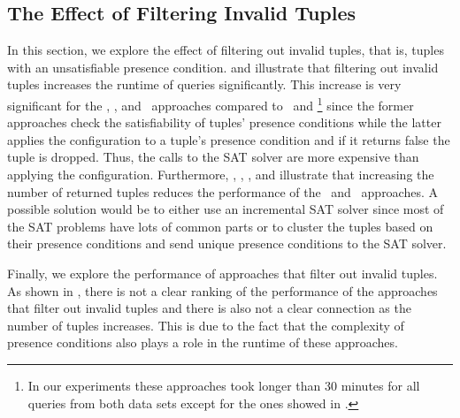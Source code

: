 \subsection{The Effect of Filtering Invalid Tuples}
\label{sec:exp-tuples}

In this section, we explore the effect of filtering out invalid tuples, that is, tuples with
an unsatisfiable presence condition.  and 
illustrate that filtering out invalid tuples increases the runtime of queries significantly. 
%
This increase is very significant for the \ubf, \ubfi, and \uav\ approaches compared to
\nbf\ and \nbfi\footnote{In our experiments these approaches took longer than 30 minutes for 
all queries from both data sets except for the ones showed in .
}
since the former approaches check the satisfiability of tuples' 
presence conditions while the latter applies the configuration to a tuple's 
presence condition and if it returns false the tuple is dropped. Thus,
the calls to the SAT solver are more expensive than applying the configuration.
%
Furthermore, , , 
, and  illustrate that increasing the number of 
returned tuples reduces the performance of the \nbf\ and \nbfi\ approaches. 
%
A possible solution would be to either use an incremental SAT solver since most of the
SAT problems have lots of common parts or to cluster the tuples based on their presence
conditions and send unique presence conditions to the SAT solver. 

Finally, we explore the performance of approaches that filter out invalid tuples. 
As shown in , there is not a clear ranking of
the performance of the approaches that filter out invalid tuples and there is also
not a clear connection as the number of tuples increases. This is due to the fact that 
the complexity of presence conditions also plays a role in the runtime of these approaches. 

